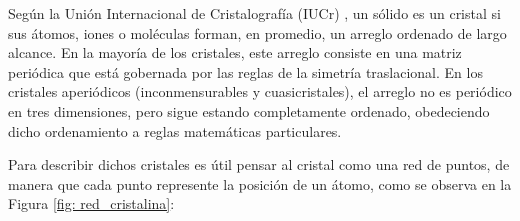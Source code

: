 Según la Unión Internacional de Cristalografía (IUCr) \cite{iucr_crystal}, un sólido es un cristal si sus átomos, iones o moléculas forman, en promedio, un arreglo ordenado de largo alcance. En la mayoría de los cristales, este arreglo consiste en una matriz periódica que está gobernada por las reglas de la simetría traslacional.
En los cristales aperiódicos (inconmensurables y cuasicristales), el arreglo no es periódico en tres dimensiones, pero sigue estando completamente ordenado, obedeciendo dicho ordenamiento a reglas matemáticas particulares.

Para describir dichos cristales es útil pensar al cristal como una red de puntos, de manera que cada punto represente la posición de un átomo, como se observa en la Figura \ref{fig: red_cristalina}:

\begin{figure}[!h]
    \centering
    


\begin{tikzpicture}[x=0.75pt,y=0.75pt,yscale=-.9,xscale=.9]


\end{tikzpicture}
\end{figure}
